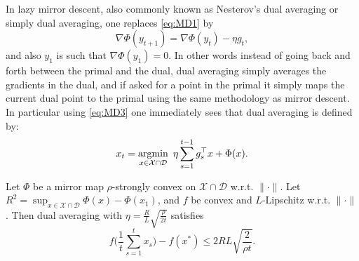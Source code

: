 In lazy mirror descent, also commonly known as Nesterov's dual averaging or simply dual averaging, one replaces \eqref{eq:MD1} by
$$\nabla \Phi(y_{t+1}) = \nabla \Phi(y_{t}) - \eta g_t ,$$
and also $y_1$ is such that $\nabla \Phi(y_1) = 0$. In other words instead of going back and forth between the primal and the dual, dual averaging simply averages the gradients in the dual, and if asked for a point in the primal it simply maps the current dual point to the primal using the same methodology as mirror descent. In particular using \eqref{eq:MD3} one immediately sees that dual averaging is defined by:
\begin{equation} \label{eq:DA0}
x_t = \mathop{\mathrm{argmin}}_{x \in \mathcal{X} \cap \mathcal{D}} \ \eta \sum_{s=1}^{t-1} g_s^{\top} x + \Phi(x) .
\end{equation}
\begin{theorem}
Let $\Phi$ be a mirror map $\rho$-strongly convex on $\mathcal{X} \cap \mathcal{D}$ w.r.t. $\|\cdot\|$.
Let $R^2 = \sup_{x \in \mathcal{X} \cap \mathcal{D}} \Phi(x) - \Phi(x_1)$, and $f$ be convex and $L$-Lipschitz w.r.t. $\|\cdot\|$. Then dual averaging with $\eta = \frac{R}{L} \sqrt{\frac{\rho}{2 t}}$ satisfies
$$f\bigg(\frac{1}{t} \sum_{s=1}^t x_s \bigg) - f(x^*) \leq 2 RL \sqrt{\frac{2}{\rho t}} .$$
\end{theorem}

